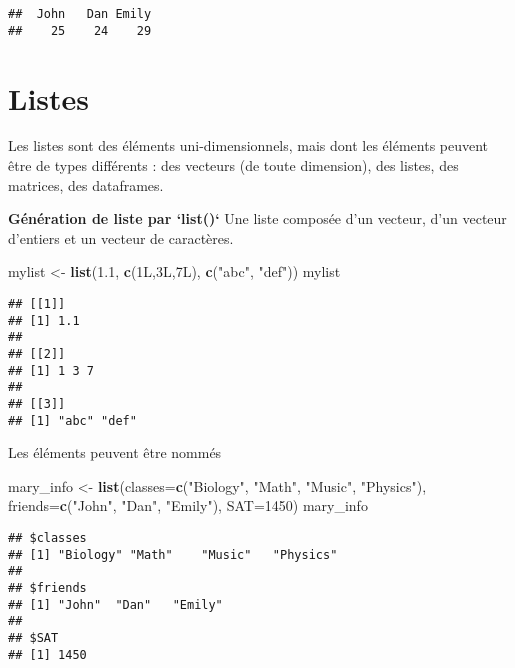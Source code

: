 \documentclass[]{book}
\newenvironment{Shaded}{\begin{snugshade}}{\end{snugshade}}
\newcommand{\DataTypeTok}[1]{\textcolor[rgb]{0.13,0.29,0.53}{#1}}
\newcommand{\DecValTok}[1]{\textcolor[rgb]{0.00,0.00,0.81}{#1}}
\newcommand{\FloatTok}[1]{\textcolor[rgb]{0.00,0.00,0.81}{#1}}
\newcommand{\KeywordTok}[1]{\textcolor[rgb]{0.13,0.29,0.53}{\textbf{#1}}}
\newcommand{\NormalTok}[1]{#1}
\newcommand{\StringTok}[1]{\textcolor[rgb]{0.31,0.60,0.02}{#1}}
\begin{document}
\begin{verbatim}
##  John   Dan Emily 
##    25    24    29
\end{verbatim}

\hypertarget{listes-1}{%
\section{Listes}\label{listes-1}}

Les listes sont des éléments uni-dimensionnels, mais dont les éléments peuvent être de types différents : des vecteurs (de toute dimension), des listes, des matrices, des dataframes.

\textbf{Génération de liste par `list()`}
Une liste composée d'un vecteur, d'un vecteur d'entiers et un vecteur de caractères.

\begin{Shaded}
\begin{Highlighting}[]
\NormalTok{mylist <-}\StringTok{ }\KeywordTok{list}\NormalTok{(}\FloatTok{1.1}\NormalTok{, }\KeywordTok{c}\NormalTok{(1L,3L,7L), }\KeywordTok{c}\NormalTok{(}\StringTok{"abc"}\NormalTok{, }\StringTok{"def"}\NormalTok{))}
\NormalTok{mylist}
\end{Highlighting}
\end{Shaded}

\begin{verbatim}
## [[1]]
## [1] 1.1
## 
## [[2]]
## [1] 1 3 7
## 
## [[3]]
## [1] "abc" "def"
\end{verbatim}

Les éléments peuvent être nommés

\begin{Shaded}
\begin{Highlighting}[]
\NormalTok{mary_info <-}\StringTok{ }\KeywordTok{list}\NormalTok{(}\DataTypeTok{classes=}\KeywordTok{c}\NormalTok{(}\StringTok{"Biology"}\NormalTok{, }\StringTok{"Math"}\NormalTok{, }\StringTok{"Music"}\NormalTok{,}
                            \StringTok{"Physics"}\NormalTok{),}
                  \DataTypeTok{friends=}\KeywordTok{c}\NormalTok{(}\StringTok{"John"}\NormalTok{, }\StringTok{"Dan"}\NormalTok{, }\StringTok{"Emily"}\NormalTok{),}
                  \DataTypeTok{SAT=}\DecValTok{1450}\NormalTok{)}
\NormalTok{mary_info}
\end{Highlighting}
\end{Shaded}

\begin{verbatim}
## $classes
## [1] "Biology" "Math"    "Music"   "Physics"
## 
## $friends
## [1] "John"  "Dan"   "Emily"
## 
## $SAT
## [1] 1450
\end{verbatim}
\end{document}
